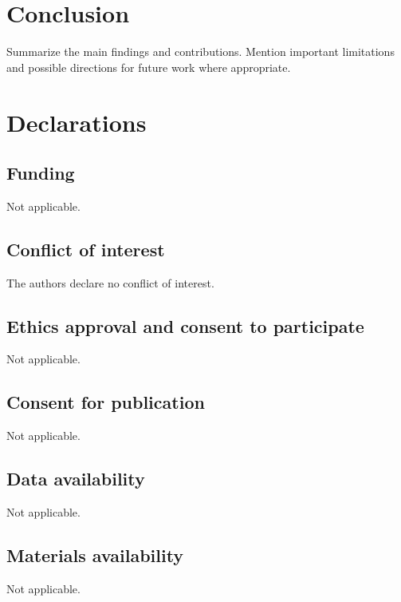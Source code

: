 \documentclass[pdflatex,sn-mathphys-num]{sn-jnl}
\theoremstyle{thmstyleone}
\theoremstyle{thmstyletwo}
\theoremstyle{thmstylethree}
\begin{document}
\section{Conclusion}\label{sec:conclusion}

Summarize the main findings and contributions. Mention important limitations and possible directions for future work where appropriate.


\backmatter



\section*{Declarations}

\subsection*{Funding}
Not applicable.

\subsection*{Conflict of interest}
The authors declare no conflict of interest.

\subsection*{Ethics approval and consent to participate}
Not applicable.

\subsection*{Consent for publication}
Not applicable.

\subsection*{Data availability}
Not applicable.

\subsection*{Materials availability}
Not applicable.
\end{document}
